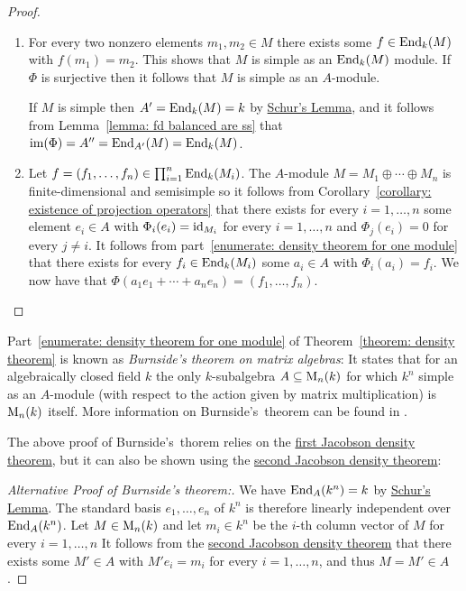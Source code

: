 \begin{proof}
  \leavevmode
  \begin{enumerate}
    \item
      For every two nonzero elements $m_1, m_2 \in M$ there exists some $f \in \operatorname{End}_k(M)$ with $f(m_1) = m_2$.
      This shows that $M$ is simple as an $\operatorname{End}_k(M)$ module.
      If $\Phi$ is surjective then it follows that $M$ is simple as an $A$-module.
      
      If $M$ is simple then $A' = \operatorname{End}_k(M) = k$ by \hyperref[proposition: schurs lemma for modules]{Schur’s Lemma}, and it follows from Lemma~\ref{lemma: fd balanced are ss} that $\operatorname{im}(\Phi) = A'' = \operatorname{End}_{A'}(M) = \operatorname{End}_k(M)$.
    \item
      Let $f = (f_1, \dotsc, f_n) \in \prod_{i=1}^n \operatorname{End}_k(M_i)$.
      The $A$-module $M = M_1 \oplus \dotsb \oplus M_n$ is finite-dimensional and semisimple so it follows from Corollary~\ref{corollary: existence of projection operators} that there exists for every $i = 1, \dotsc, n$ some element $e_i \in A$ with $\Phi_i(e_i) = \operatorname{id}_{M_i}$ for every $i = 1, \dotsc, n$ and $\Phi_j(e_i) = 0$ for every $j \neq i$.
      It follows from part~\ref*{enumerate: density theorem for one module} that there exists for every $f_i \in \operatorname{End}_k(M_i)$ some $a_i \in A$ with $\Phi_i(a_i) = f_i$.
      We now have that $\Phi(a_1 e_1 + \dotsb + a_n e_n) = (f_1, \dotsc, f_n)$.
    \qedhere
  \end{enumerate}
\end{proof}


\begin{remark}
  Part~\ref*{enumerate: density theorem for one module} of Theorem~\ref{theorem: density theorem} is known as \emph{Burnside’s theorem on matrix algebras}:
  It states that for an algebraically closed field $k$ the only $k$-subalgebra $A \subseteq \operatorname{M}_n(k)$ for which $k^n$ simple as an $A$-module (with respect to the action given by matrix multiplication) is $\operatorname{M}_n(k)$ itself.
  More information on Burnside’s~theorem can be found in \cite{ShapiroBurnside}.
  
  The above proof of Burnside’s~thorem  relies on the \hyperref[theorem: first jacobson density theorem]{first Jacobson density theorem}, but it can also be shown using the \hyperref[theorem: second jacobson density theorem]{second Jacobson density theorem}:
\end{remark}


\begin{proof}[Alternative Proof of Burnside’s theorem:]
  We have $\operatorname{End}_A(k^n) = k$ by \hyperref[proposition: schurs lemma for modules]{Schur’s Lemma}.
  The standard basis $e_1, \dotsc, e_n$ of $k^n$ is therefore linearly independent over $\operatorname{End}_A(k^n)$.
  Let $M \in \operatorname{M}_n(k)$ and let $m_i \in k^n$ be the $i$-th column vector of $M$ for every $i = 1, \dotsc, n$
  It follows from the \hyperref[theorem: second jacobson density theorem]{second Jacobson density theorem} that there exists some $M' \in A$ with $M' e_i = m_i$ for every $i = 1, \dotsc, n$, and thus $M = M' \in A$.
\end{proof}


